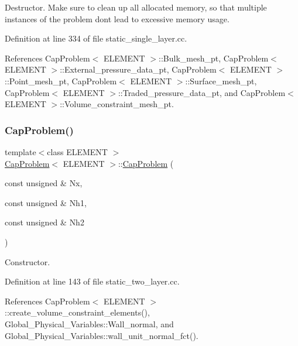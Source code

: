 Destructor. Make sure to clean up all allocated memory, so that multiple instances of the problem don\textquotesingle{}t lead to excessive memory usage. 

Definition at line 334 of file static\+\_\+single\+\_\+layer.\+cc.



References Cap\+Problem$<$ E\+L\+E\+M\+E\+N\+T $>$\+::\+Bulk\+\_\+mesh\+\_\+pt, Cap\+Problem$<$ E\+L\+E\+M\+E\+N\+T $>$\+::\+External\+\_\+pressure\+\_\+data\+\_\+pt, Cap\+Problem$<$ E\+L\+E\+M\+E\+N\+T $>$\+::\+Point\+\_\+mesh\+\_\+pt, Cap\+Problem$<$ E\+L\+E\+M\+E\+N\+T $>$\+::\+Surface\+\_\+mesh\+\_\+pt, Cap\+Problem$<$ E\+L\+E\+M\+E\+N\+T $>$\+::\+Traded\+\_\+pressure\+\_\+data\+\_\+pt, and Cap\+Problem$<$ E\+L\+E\+M\+E\+N\+T $>$\+::\+Volume\+\_\+constraint\+\_\+mesh\+\_\+pt.

\mbox{\label{classCapProblem_a7b3e0784884fa8bf9d151139b00951c7}} 
\subsubsection{\texorpdfstring{Cap\+Problem()}{CapProblem()}\hspace{0.1cm}{\footnotesize\ttfamily [2/2]}}
{\footnotesize\ttfamily template$<$class E\+L\+E\+M\+E\+NT $>$ \\
\hyperlink{classCapProblem}{Cap\+Problem}$<$ E\+L\+E\+M\+E\+NT $>$\+::\hyperlink{classCapProblem}{Cap\+Problem} (\begin{DoxyParamCaption}\item[{const unsigned \&}]{Nx,  }\item[{const unsigned \&}]{Nh1,  }\item[{const unsigned \&}]{Nh2 }\end{DoxyParamCaption})}



Constructor. 



Definition at line 143 of file static\+\_\+two\+\_\+layer.\+cc.



References Cap\+Problem$<$ E\+L\+E\+M\+E\+N\+T $>$\+::create\+\_\+volume\+\_\+constraint\+\_\+elements(), Global\+\_\+\+Physical\+\_\+\+Variables\+::\+Wall\+\_\+normal, and Global\+\_\+\+Physical\+\_\+\+Variables\+::wall\+\_\+unit\+\_\+normal\+\_\+fct().



